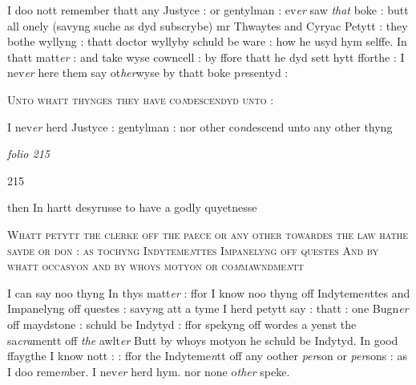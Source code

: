 \documentclass[12pt, a4paper]{book}
\begin{document}
		\ifthenelse{\isodd{\thepage}}
		{\reversemarginpar}
		{\normalmarginpar}
		I doo nott remember thatt any Justyce : or gentylman : ev\textit{er }saw\textit{ that} 
boke : butt all onely (savyng suche as dyd subscrybe) mr Thwaytes
and Cyryac Petytt : they bothe wyllyng : thatt doctor wyllyby
schuld be ware : how he usyd hym selffe. In thatt matt\textit{er} : and take wyse
cowncell : by ffore thatt he dyd sett hytt fforthe : I nev\textit{er} here
them say ot\textit{her}wyse by thatt boke p\textit{re}sentyd :

				\begin{center} \begin{large} {\scshape Unto whatt thynges they
have co\textit{n}descendyd unto :} \end{large} \end{center}
			

		\ifthenelse{\isodd{\thepage}}
		{\reversemarginpar}
		{\normalmarginpar}
		I nev\textit{er} herd Justyce : gentylman : nor other co\textit{n}descend unto any other thyng

\dotfill
						\newpage
{}

\textit{folio 215}


\begin{flushright}{\color{Mahogany}215}\end{flushright}

		\ifthenelse{\isodd{\thepage}}
		{\reversemarginpar}
		{\normalmarginpar}
		then In hartt desyrusse to have a godly quyetnesse
		
				\begin{center} \begin{large} {\scshape Whatt petytt the clerke off the paece
		or any other towardes the law hathe 
		sayde or don : as tochyng Indyteme\textit{n}ttes
		Impanelyng off questes And by whatt
		occasyon and by whoys motyon or co\textit{m}mawndme\textit{n}tt} \end{large} \end{center}
			

		\ifthenelse{\isodd{\thepage}}
		{\reversemarginpar}
		{\normalmarginpar}
		I can say noo thyng In thys matt\textit{er }: ffor I know noo thyng
off Indyteme\textit{n}ttes and Impanelyng off questes : savy\textit{n}g att a tyme
I herd petytt say : thatt : one Bugn\textit{er} off maydstone : schuld be 
Indytyd : ffor spekyng off wordes a yenst the sa\textit{cra}mentt off \textit{the} awlt\textit{er}
Butt by whoys motyon he schuld be Indytyd. In good ffaygthe I 
know nott : : ffor the Indyteme\textit{n}tt off any oother \textit{per}son or \textit{per}sons : 
as I doo reme\textit{m}ber. I nev\textit{er} herd hym. nor none o\textit{ther} speke.
		
\end{document}
